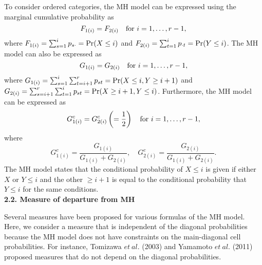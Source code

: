 \documentclass[a4j,12pt]{article}
\begin{document}
To consider ordered categories, the MH model can be expressed using the marginal cumulative probability as
\[
F_{1(i)} = F_{2(i)}  \quad {\rm for} ~ i = 1, \ldots , r-1,
\]
where $F_{1(i)} = \sum^i_{s=1} p_{s \cdot} = {\rm Pr}(X \leq i)$ and $F_{2(i)} = \sum^i_{t=1} p_{\cdot t} = {\rm Pr}(Y \leq i)$.
The MH model can also be expressed as
\[
G_{1(i)} = G_{2(i)} \quad {\rm for} ~ i = 1, \ldots , r-1,
\]
where $G_{1(i)} = \sum^i_{s=1} \sum^r_{t=i+1} p_{st} = {\rm Pr}(X \leq i, Y \geq i+1)$ and $G_{2(i)} = \sum^r_{s=i+1} \sum^i_{t=1} p_{st} = {\rm Pr}(X \geq i+1, Y \leq i)$.
Furthermore, the MH model can be expressed as
\[
G^c_{1(i)} = G^c_{2(i)} \left( = \frac{1}{2} \right) \quad {\rm for} ~ i = 1, \ldots , r-1,
\]
where
\[
G^c_{1(i)} = \frac{G_{1(i)}}{G_{1(i)} + G_{2(i)}},
\quad
G^c_{2(i)} = \frac{G_{2(i)}}{G_{1(i)} + G_{2(i)}}.
\]
The MH model states that the conditional probability of $X \leq i$ is given if either $X$ or $Y \leq i$ and the other $\geq i+1$ is equal to the conditional probability that $Y \leq i$ for the same conditions.
\\


\noindent \textbf{\large 2.2. Measure of departure from MH}

Several measures have been proposed for various formulas of the MH model. 
Here, we consider a measure that is independent of the diagonal probabilities because the MH model does not have constraints on the main-diagonal cell probabilities. 
For instance, Tomizawa $et~al.$ (2003) and Yamamoto $et~al.$ (2011) proposed measures that do not depend on the diagonal probabilities.
\end{document}
